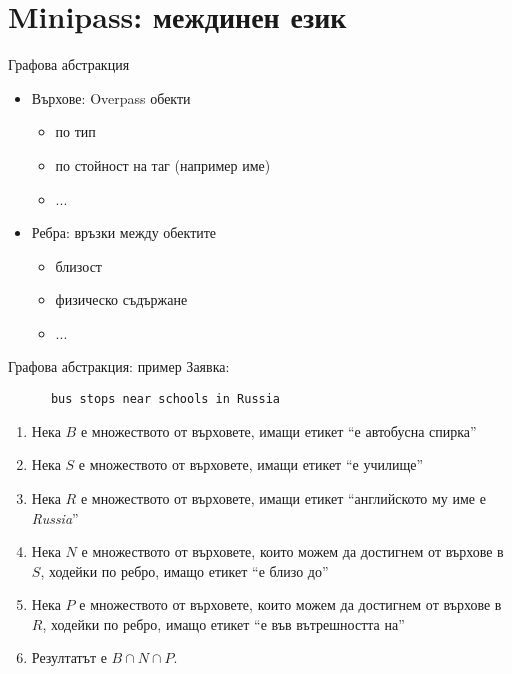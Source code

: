 \documentclass[9pt]{beamer}
\begin{document}
  \section{Minipass: междинен език}
  \begin{frame}{Графова абстракция}
    \begin{itemize}
      \item Върхове: Overpass обекти
        \begin{itemize}
          \item по тип
          \item по стойност на таг (например име)
          \item ...
        \end{itemize}
      \item Ребра: връзки между обектите \pika
        \begin{itemize}
          \item близост
          \item физическо съдържане
          \item ...
        \end{itemize}
    \end{itemize}
  \end{frame}

  \begin{frame}[fragile]{Графова абстракция: пример}
    Заявка:
    \begin{lstwrap}\begin{lstlisting}
      bus stops near schools in Russia
    \end{lstlisting}\end{lstwrap}

    \begin{enumerate}
      \item Нека $B$ е множеството от върховете, имащи етикет
        ``е автобусна спирка''
      \item Нека $S$ е множеството от върховете, имащи етикет
        ``е училище''
      \item Нека $R$ е множеството от върховете, имащи етикет
        ``английското му име е \emph{Russia}''
      \item Нека $N$ е множеството от върховете, които можем да
        достигнем от върхове в $S$, ходейки по ребро, имащо етикет
        ``е близо до''
      \item Нека $P$ е множеството от върховете, които можем да
        достигнем от върхове в $R$, ходейки по ребро, имащо етикет
        ``е във вътрешността на''
      \item Резултатът е $B \cap N \cap P$.
    \end{enumerate}
  \end{frame}
\end{document}
